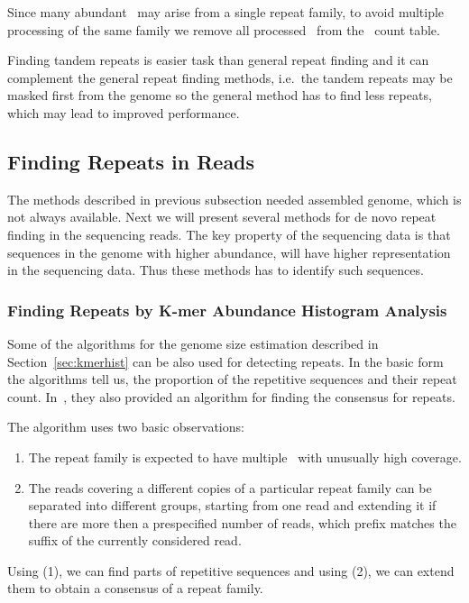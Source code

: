 Since many abundant \kmers\ may arise from a single repeat family, to avoid multiple processing of the same family we remove all processed \kmers\ from the \kmer\ count table.

Finding tandem repeats is easier task than general repeat finding and it can complement the general repeat finding methods, i.e.\ the tandem repeats may be masked first from the genome so the general method has to find less repeats, which may lead to improved performance.

\subsection{Finding Repeats in Reads}\label{sect:repeats-reads}

The methods described in previous subsection needed assembled genome, which is not always available. Next we will present several methods for de novo repeat finding in the sequencing reads. The key property of the sequencing data is that sequences in the genome with higher abundance, will have higher representation in the sequencing data. Thus these methods has to identify such sequences.

\subsubsection{Finding Repeats by K-mer Abundance Histogram Analysis}

Some of the algorithms for the genome size estimation described in Section~\ref{sec:kmerhist} can be also used for detecting repeats.
In the basic form the algorithms tell us, the proportion of the repetitive sequences and their repeat count. In~\cite{waterman}, they also provided an algorithm for finding the consensus for repeats.

The algorithm uses two basic observations:

\begin{enumerate}
  \item The repeat family is expected to have multiple \kmers\ with  unusually high coverage.
  \item The reads covering a different copies of a particular repeat family can be separated into different groups, starting from one read and extending it if there are more then a prespecified number of reads, which prefix matches the suffix of the currently considered read.
\end{enumerate}

Using (1), we can find parts of repetitive sequences and using (2), we can extend them to obtain a consensus of a repeat family.

